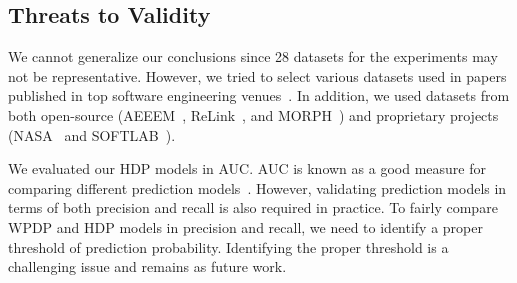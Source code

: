 % 
% 
% 

\subsection{Threats to Validity}

We cannot generalize our conclusions since 28 datasets for the experiments may
not be representative.
	However, we tried to select various datasets used in papers published
	in top software engineering
	venues~\cite{DAmbros12,Lessmann08,Nam13,Peters12,Turhan09,Wu11}. In addition,
	we used datasets from both open-source (AEEEM~\cite{DAmbros12,Nam13},
	ReLink~\cite{Wu11}, and MORPH~\cite{Peters12}) and proprietary projects
	(NASA~\cite{Lessmann08,Turhan09} and SOFTLAB~\cite{Turhan09}).

We evaluated our HDP models in AUC.
	AUC is known as a good measure for comparing different prediction
	models~\cite{Giger12,Lessmann08,Rahman12,Song11}. However, validating
	prediction models in terms of both precision and recall is also required in
	practice. To fairly compare WPDP and HDP models in precision
	and recall, we need to identify a proper threshold of prediction probability.
	Identifying the proper threshold is a challenging issue and remains as
	future work.

